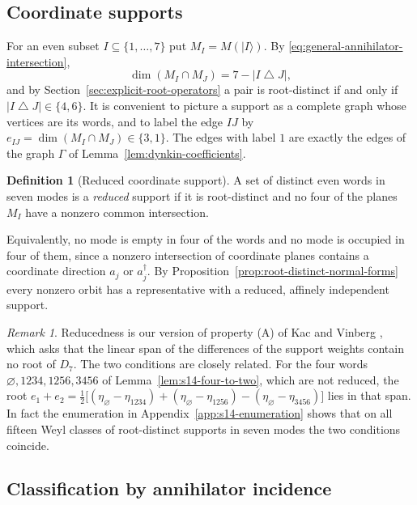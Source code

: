 \documentclass{article}
\theoremstyle{definition}
\newtheorem{definition}[theorem]{Definition}
\theoremstyle{remark}
\newtheorem{remark}[theorem]{Remark}
\newcommand{\ket}[1]{\lvert #1\rangle}
\newcommand{\symdiff}{\mathbin{\triangle}}
\begin{document}
\subsection{Coordinate supports}
\label{sec:s14-weights}

For an even subset $I\subseteq\{1,\ldots,7\}$ put $M_I=M(\ket I)$. By
\eqref{eq:general-annihilator-intersection},
\begin{equation}
 \dim(M_I\cap M_J)=7-\lvert I\symdiff J\rvert,
 \label{eq:s14-intersection}
\end{equation}
and by Section~\ref{sec:explicit-root-operators} a pair is root-distinct if
and only if $\lvert I\symdiff J\rvert\in\{4,6\}$. It is convenient to picture
a support as a complete graph whose vertices are its words, and to label the
edge $IJ$ by $e_{IJ}=\dim(M_I\cap M_J)\in\{3,1\}$. The edges with label $1$ are
exactly the edges of the graph $\Gamma$ of Lemma~\ref{lem:dynkin-coefficients}.

\begin{definition}[Reduced coordinate support]
\label{def:reduced-coordinate}
A set of distinct even words in seven modes is a \emph{reduced} support if
it is root-distinct and no four of the planes $M_I$ have a nonzero common
intersection.
\end{definition}

Equivalently, no mode is empty in four of the words and no mode is occupied
in four of them, since a nonzero intersection of coordinate planes contains a
coordinate direction $a_j$ or $a_j^\dagger$. By
Proposition~\ref{prop:root-distinct-normal-forms} every nonzero orbit has a
representative with a reduced, affinely independent support.

\begin{remark}
\label{rem:property-A}
Reducedness is our version of property (A) of Kac and Vinberg
\cite[Section~1.2]{Gatti_dim13}, which asks that the linear span of the
differences of the support weights contain no root of $D_7$. The two
conditions are closely related. For the four words
$\varnothing,1234,1256,3456$ of Lemma~\ref{lem:s14-four-to-two}, which are not
reduced, the root $e_1+e_2=\frac12\bigl[(\eta_\varnothing-\eta_{1234})
+(\eta_\varnothing-\eta_{1256})-(\eta_\varnothing-\eta_{3456})\bigr]$ lies in
that span. In fact the enumeration in Appendix~\ref{app:s14-enumeration} shows
that on all fifteen Weyl classes of root-distinct supports in seven modes the
two conditions coincide.
\end{remark}

\subsection{Classification by annihilator incidence}
\label{sec:s14-incidence}
\end{document}
